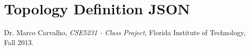 \documentclass{scrartcl}
\begin{document}
\section{Topology Definition JSON} \label{appendix:topology}


\newpage
%
%
\begin{thebibliography}{30}
 Dr. Marco Carvalho, \emph{CSE5231 - Class Project}, Florida Institute of Technology, Fall 2013.
    
\end{thebibliography}
\end{document}
